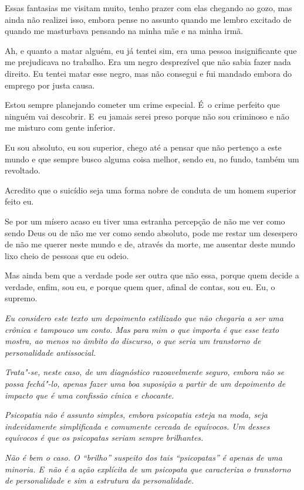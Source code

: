 Essas fantasias me visitam muito, tenho prazer com elas chegando ao
gozo, mas ainda não realizei isso, embora pense no assunto quando me
lembro excitado de quando me masturbava pensando na minha mãe e na minha irmã.

Ah, e quanto a matar alguém, eu já tentei sim, era uma pessoa
insignificante que me prejudicava no trabalho. Era um negro desprezível
que não sabia fazer nada direito. Eu tentei matar esse negro, mas não
consegui e fui mandado embora do emprego por justa causa.

Estou sempre planejando cometer um crime especial. É~o crime perfeito
que ninguém vai descobrir. E~eu jamais serei preso porque não sou
criminoso e não me misturo com gente inferior.

Eu sou absoluto, eu sou superior, chego até a pensar que não pertenço a
este mundo e que sempre busco alguma coisa melhor, sendo eu, no fundo,
também um revoltado.

Acredito que o suicídio seja uma forma nobre de conduta de um homem
superior feito eu.

Se por um mísero acaso eu tiver uma estranha percepção de não me ver
como sendo Deus ou de não me ver como sendo absoluto, pode me restar um
desespero de não me querer neste mundo e de, através da morte, me
ausentar deste mundo lixo cheio de pessoas que eu odeio.

Mas ainda bem que a verdade pode ser outra que não essa, porque quem
decide a verdade, enfim, sou eu, e porque quem quer, afinal de contas,
sou eu. Eu, o supremo.

\begin{center}\asterisc{}\end{center}
\begingroup\small

\emph{Eu considero este texto um depoimento estilizado que não chegaria
a ser uma crônica e tampouco um conto. Mas para mim o que importa é que
esse texto mostra, ao menos no âmbito do discurso, o que seria um
transtorno de personalidade antissocial.}

\emph{Trata"-se, neste caso, de um diagnóstico razoavelmente seguro,
embora não se possa fechá"-lo, apenas fazer uma boa suposição a partir de
um depoimento de impacto que é uma confissão cínica e chocante.}

\emph{Psicopatia não é assunto simples, embora psicopatia esteja na
moda, seja indevidamente simplificada e comumente cercada de equívocos.
Um desses equívocos é que os psicopatas seriam sempre brilhantes.}

\emph{Não é bem o caso. O ``brilho'' suspeito dos tais ``psicopatas'' é
apenas de uma minoria. E~não é a ação explícita de um psicopata que
caracteriza o transtorno de personalidade e sim a estrutura da
personalidade.}

